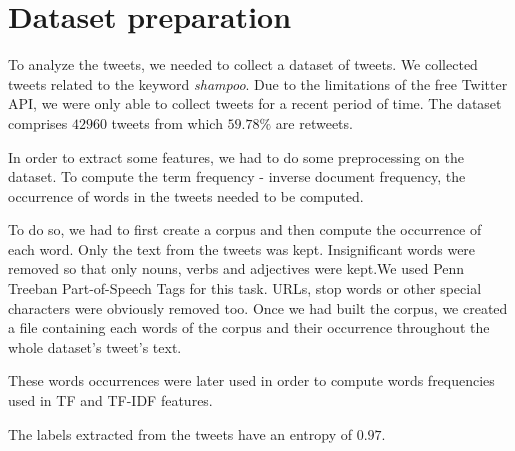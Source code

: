 \section{Dataset preparation}

To analyze the tweets, we needed to collect a dataset of tweets.
We collected tweets related to the keyword \textit{shampoo}. Due to the
limitations of the free Twitter API, we were only able to collect tweets for a
recent period of time. The dataset comprises $42960$ tweets from which 
$59.78\%$ are retweets.

In order to extract some features, we had to do some preprocessing on the
dataset. To compute the term frequency - inverse document frequency, the
occurrence of words in the tweets needed to be computed.

To do so, we had to first create a corpus and then compute the occurrence of
each word. Only the text from the tweets was kept. Insignificant words were 
removed so that only nouns, verbs and adjectives were kept.We used Penn Treeban 
Part-of-Speech Tags for this task.  URLs, stop words or other special 
characters were obviously removed too. Once we had built the corpus, we created 
a file containing each words of the corpus and their occurrence throughout the 
whole dataset's tweet's text.

These words occurrences were later used in order to compute words frequencies 
used in TF and TF-IDF features.

The labels extracted from the tweets have an entropy of $0.97$.
